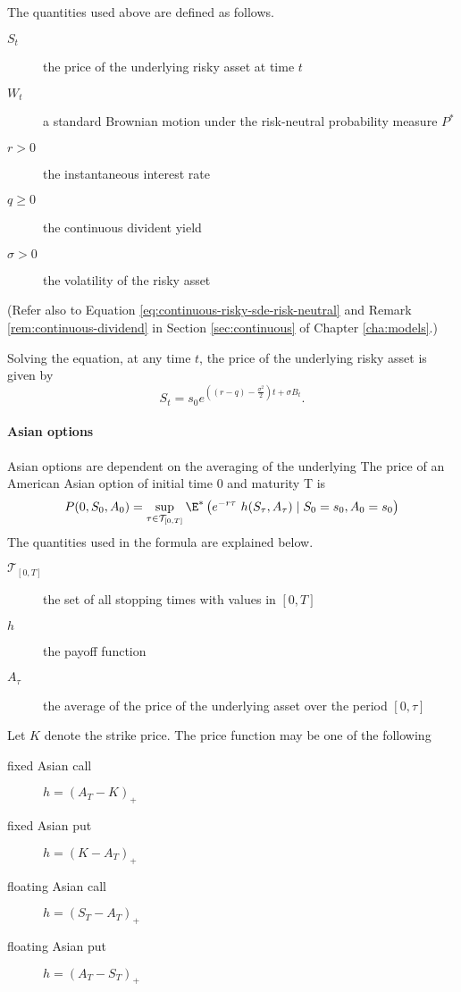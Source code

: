The quantities used above are defined as follows.
\begin{description}
	\item[$ S_t $] the price of the underlying risky asset at time $ t $
	\item[$ W_t $] a standard Brownian motion under the risk-neutral probability measure $ P^* $
	\item[$ r > 0 $] the instantaneous interest rate
	\item[$ q \ge 0 $] the continuous divident yield
	\item[$ \sigma > 0 $] the volatility of the risky asset
\end{description}
(Refer also to Equation \ref{eq:continuous-risky-sde-risk-neutral} and Remark \ref{rem:continuous-dividend} in Section \ref{sec:continuous} of Chapter \ref{cha:models}.)

Solving the equation, at any time $ t $, the price of the underlying risky asset is given by
\begin{equation*}
\label{eq:clq-risky-prc}
S_t = s_0 e^{ ( (r - q) - \frac{\sigma^2}{2} )t + \sigma B_t }.
\end{equation*}


\paragraph{Asian options}
Asian options are dependent on the averaging of the underlying
The price of an American Asian option of initial time 0 and maturity T is
\begin{equation}
	P(0, S_0, A_0) = \sup_{\tau \in \mathcal{T}_{[0,T]}}  \E^* \left(  e^{-r \tau} \  h(S_{\tau}, A_{\tau})  \mid  S_0 = s_0, A_0 = s_0  \right) 
\end{equation}
The quantities used in the formula are explained below.
\begin{description}
	\item[$ \mathcal{T}_{[0,T]} $] the set of all stopping times with values in $ [0, T ] $
	\item[$ h $] the payoff function
	\item[$ A_\tau $] the average of the price of the underlying asset over the period $ [0, \tau] $
\end{description}

Let $ K $ denote the strike price. The price function may be one of the following
\begin{description}
	\item[fixed Asian call] $ h = (A_T - K)_+ $
	\item[fixed Asian put] $ h = (K - A_T)_+ $
	\item[floating Asian call] $ h = (S_T - A_T)_+ $
	\item[floating Asian put] $ h = (A_T - S_T)_+ $
\end{description}

